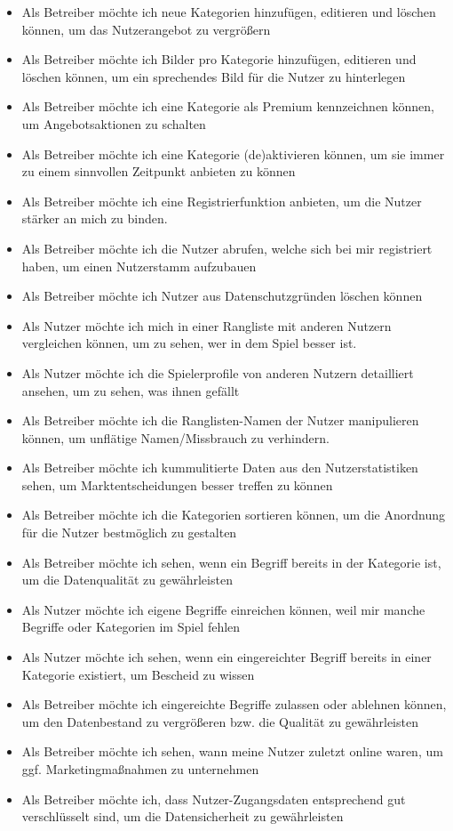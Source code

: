 {\begin{itemize}
	\item Als Betreiber möchte ich neue Kategorien hinzufügen, editieren und löschen können, um das Nutzerangebot zu vergrößern
	\item Als Betreiber möchte ich Bilder pro Kategorie hinzufügen, editieren und löschen können, um ein sprechendes Bild für die Nutzer zu hinterlegen
	\item Als Betreiber möchte ich eine Kategorie als Premium kennzeichnen können, um Angebotsaktionen zu schalten
	\item Als Betreiber möchte ich eine Kategorie (de)aktivieren können, um sie immer zu einem sinnvollen Zeitpunkt anbieten zu können
	\item Als Betreiber möchte ich eine Registrierfunktion anbieten, um die Nutzer stärker an mich zu binden.
	\item Als Betreiber möchte ich die Nutzer abrufen, welche sich bei mir registriert haben, um einen Nutzerstamm aufzubauen
	\item Als Betreiber möchte ich Nutzer aus Datenschutzgründen löschen können
	\item Als Nutzer möchte ich mich in einer Rangliste mit anderen Nutzern vergleichen können, um zu sehen, wer in dem Spiel besser ist.
	\item Als Nutzer möchte ich die Spielerprofile von anderen Nutzern detailliert ansehen, um zu sehen, was ihnen gefällt 
	\item Als Betreiber möchte ich die Ranglisten-Namen der Nutzer manipulieren können, um unflätige Namen/Missbrauch zu verhindern.
	\item Als Betreiber möchte ich kummulitierte Daten aus den Nutzerstatistiken sehen, um Marktentscheidungen besser treffen zu können
	\item Als Betreiber möchte ich die Kategorien sortieren können, um die Anordnung für die Nutzer bestmöglich zu gestalten
	\item Als Betreiber möchte ich sehen, wenn ein Begriff bereits in der Kategorie ist, um die Datenqualität zu gewährleisten
	\item Als Nutzer möchte ich eigene Begriffe einreichen können, weil mir manche Begriffe oder Kategorien im Spiel fehlen
	\item Als Nutzer möchte ich sehen, wenn ein eingereichter Begriff bereits in einer Kategorie existiert, um Bescheid zu wissen
	\item Als Betreiber möchte ich eingereichte Begriffe zulassen oder ablehnen können, um den Datenbestand zu vergrößeren bzw. die Qualität zu gewährleisten 
	\item Als Betreiber möchte ich sehen, wann meine Nutzer zuletzt online waren, um ggf. Marketingmaßnahmen zu unternehmen
	\item Als Betreiber möchte ich, dass Nutzer-Zugangsdaten entsprechend gut verschlüsselt sind, um die Datensicherheit zu gewährleisten
\end{itemize}

}
